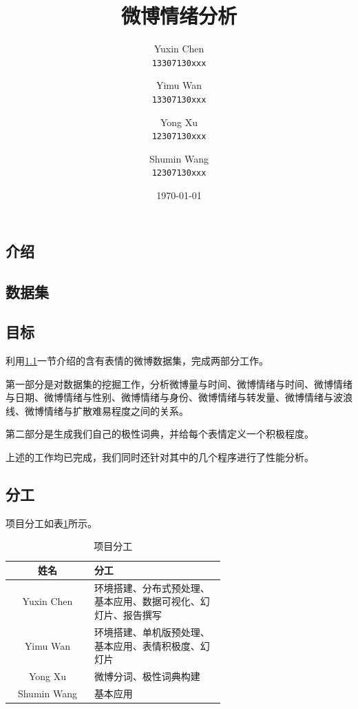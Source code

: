 \documentclass[12pt, oneside]{article}
\title{微博情绪分析}
\author{
	Yuxin Chen\\
	\texttt{13307130xxx}
	\and
	Yimu Wan\\
	\texttt{13307130xxx}
	\and
	Yong Xu\\
	\texttt{12307130xxx}
	\and
	Shumin Wang\\
	\texttt{12307130xxx}
}
\date{\today}
\begin{document}
\begin{spacing}{1.5}
\begin{CJK}{UTF8}{gbsn}

\maketitle


\newpage

\section{介绍}
\subsection{数据集}
\label{subsec:dataset}

\subsection{目标}
利用\ref{subsec:dataset}一节介绍的含有表情的微博数据集，完成两部分工作。

第一部分是对数据集的挖掘工作，分析微博量与时间、微博情绪与时间、微博情绪与日期、微博情绪与性别、微博情绪与身份、微博情绪与转发量、微博情绪与波浪线、微博情绪与扩散难易程度之间的关系。

第二部分是生成我们自己的极性词典，并给每个表情定义一个积极程度。

上述的工作均已完成，我们同时还针对其中的几个程序进行了性能分析。

\subsection{分工}
项目分工如表\ref{tbl:responsibilities}所示。

\begin{table}[]
\centering
\begin{tabular}{|c|p{0.618\linewidth}|}
\hline
姓名          & 分工                              \\ \hline
Yuxin Chen  & 环境搭建、分布式预处理、基本应用、数据可视化、幻灯片、报告撰写 \\ \hline
Yimu Wan    & 环境搭建、单机版预处理、基本应用、表情积极度、幻灯片      \\ \hline
Yong Xu     & 微博分词、极性词典构建                     \\ \hline
Shumin Wang & 基本应用                            \\ \hline
\end{tabular}
\caption{项目分工}
\label{tbl:responsibilities}
\end{table}


\end{CJK}
\end{spacing}
\end{document}
